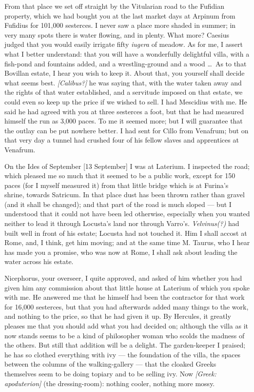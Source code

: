  From that place we set off straight by the Vitularian road to the Fufidian property, which we had bought you at the last market days at Arpinum from Fufidius for 101,000 sesterces. I never saw a place more shaded in summer; in very many spots there is water flowing, and in plenty. What more? Caesius judged that you would easily irrigate fifty \textit{iugera} of meadow. As for me, I assert what I better understand: that you will have a wonderfully delightful villa, with a fish-pond and fountains added, and a wrestling-ground and a wood \dots\ As to that Bovillan estate, I hear you wish to keep it. About that, you yourself shall decide what seems best. \textit{[Calibus?]} he was saying that, with the water taken away and the rights of that water established, and a servitude imposed on that estate, we could even so keep up the price if we wished to sell. I had Mescidius with me. He said he had agreed with you at three sesterces a foot, but that he had measured himself the run as 3,000 paces. To me it seemed more; but I will guarantee that the outlay can be put nowhere better. I had sent for Cillo from Venafrum; but on that very day a tunnel had crushed four of his fellow slaves and apprentices at Venafrum.

 On the Ides of September [13 September] I was at Laterium. I inspected the road; which pleased me so much that it seemed to be a public work, except for 150 paces (for I myself measured it) from that little bridge which is at Furina's shrine, towards Satricum. In that place dust has been thrown rather than gravel (and it shall be changed); and that part of the road is much sloped --- but I understood that it could not have been led otherwise, especially when you wanted neither to lead it through Locusta's land nor through Varro's. \textit{Velvinus(?)} had built well in front of his estate; Locusta had not touched it. Him I shall accost at Rome, and, I think, get him moving; and at the same time M. Taurus, who I hear has made you a promise, who was now at Rome, I shall ask about leading the water across his estate.

 Nicephorus, your overseer, I quite approved, and asked of him whether you had given him any commission about that little house at Laterium of which you spoke with me. He answered me that he himself had been the contractor for that work for 16,000 sesterces, but that you had afterwards added many things to the work, and nothing to the price, so that he had given it up. By Hercules, it greatly pleases me that you should add what you had decided on; although the villa as it now stands seems to be a kind of philosopher woman who scolds the madness of the others. But still that addition will be a delight. The garden-keeper I praised; he has so clothed everything with ivy --- the foundation of the villa, the spaces between the columns of the walking-gallery --- that the cloaked Greeks themselves seem to be doing topiary and to be selling ivy. Now \textit{[Greek: apoduterion]} (the dressing-room): nothing cooler, nothing more mossy.

